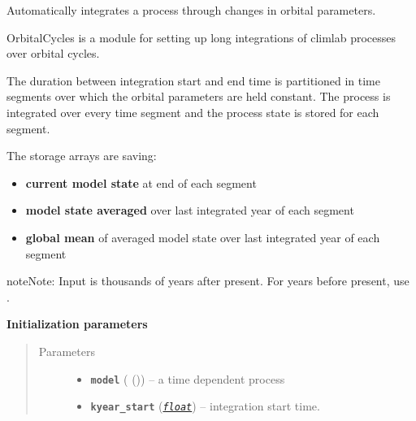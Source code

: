 \documentclass[a4paper,10pt,english]{sphinxmanual}
\begin{document}
\begin{fulllineitems}
\label{api/climlab.solar:climlab.solar.orbital_cycles.OrbitalCycles}
Automatically integrates a process through changes in orbital parameters.

OrbitalCycles is a module for setting up long integrations of climlab 
processes over orbital cycles.

The duration between integration start and end time is partitioned in 
time segments over which the orbital parameters are held constant.
The process is integrated over every time segment and the process state
 is stored for each segment.

The storage arrays are saving:
\begin{itemize}
\item {} 
\textbf{current model state} at end of each segment

\item {} 
\textbf{model state averaged} over last integrated year of each segment

\item {} 
\textbf{global mean} of averaged model state over last integrated year 
of each segment

\end{itemize}

\begin{notice}{note}{Note:}
Input  is thousands of years after present.
For years before present, use .
\end{notice}

\textbf{Initialization parameters}
\begin{quote}\begin{description}
\item[{Parameters}] \leavevmode\begin{itemize}
\item {} 
\textbf{\texttt{model}} ({\hyperref[api/climlab.process:climlab.process.time_dependent_process.TimeDependentProcess]{\emph{}}} ()) -- a time dependent process

\item {} 
\textbf{\texttt{kyear\_start}} (\href{http://docs.python.org/2.7/library/functions.html\#float}{\emph{\texttt{float}}}) -- 
integration start time.


\end{itemize}
\end{description}
\end{quote}
\end{fulllineitems}
\end{document}
